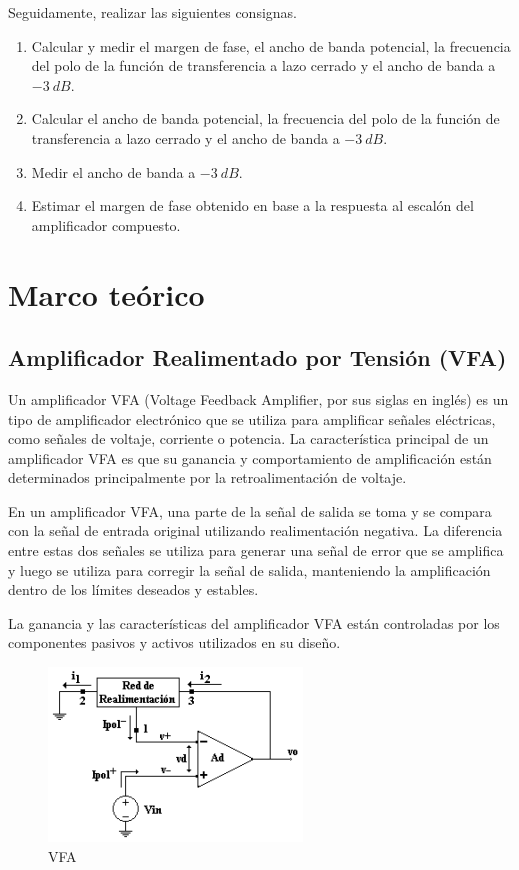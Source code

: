 \hspace{1mm} Seguidamente, realizar las siguientes consignas.
\begin{enumerate}
    \item Calcular y medir el margen de fase, el ancho de banda potencial, la frecuencia del polo de la función de transferencia a lazo cerrado y el ancho de banda a \(-3~dB\).
    \item Calcular el ancho de banda potencial, la frecuencia del polo de la función de transferencia a lazo cerrado y el ancho de banda a \(-3~dB\).
    \item Medir el ancho de banda a \(-3~dB\).
    \item Estimar el margen de fase obtenido en base a la respuesta al escalón del amplificador compuesto.
\end{enumerate}

\newpage
\section{Marco teórico}

\subsection{Amplificador Realimentado por Tensión (VFA)}

\hspace{1mm} Un amplificador VFA (Voltage Feedback Amplifier, por sus siglas en inglés) es un tipo de amplificador electrónico que se utiliza para amplificar señales eléctricas, como señales de voltaje, corriente o potencia. La característica principal de un amplificador VFA es que su ganancia y comportamiento de amplificación están determinados principalmente por la retroalimentación de voltaje.

\bigskip 
\hspace{1mm} En un amplificador VFA, una parte de la señal de salida se toma y se compara con la señal de entrada original utilizando realimentación negativa. La diferencia entre estas dos señales se utiliza para generar una señal de error que se amplifica y luego se utiliza para corregir la señal de salida, manteniendo la amplificación dentro de los límites deseados y estables.

\bigskip 
\hspace{1mm} La ganancia y las características del amplificador VFA están controladas por los componentes pasivos y activos utilizados en su diseño.

\bigskip
\begin{figure}[!h]
    \centering
    \includegraphics[scale=1]{img/VFA.png}
    \caption{VFA}
\end{figure}

